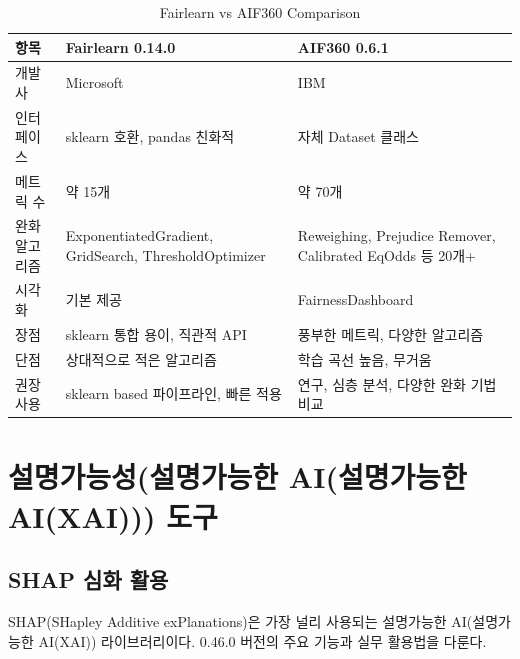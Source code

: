 \begin{table}[htbp]
\centering
\caption{Fairlearn vs AIF360 Comparison}
\label{tab:fairlearn_vs_aif360}
\begin{tabularx}{\textwidth}{p{3cm}XX}
\toprule
\textbf{항목} & \textbf{Fairlearn 0.14.0} & \textbf{AIF360 0.6.1} \\
\midrule
개발사 & Microsoft & IBM \\
\midrule
인터페이스 & sklearn 호환, pandas 친화적 & 자체 Dataset 클래스 \\
\midrule
메트릭 수 & 약 15개 & 약 70개 \\
\midrule
완화 알고리즘 & ExponentiatedGradient, GridSearch, ThresholdOptimizer & Reweighing, Prejudice Remover, Calibrated EqOdds 등 20개+ \\
\midrule
시각화 & 기본 제공 & FairnessDashboard \\
\midrule
장점 & sklearn 통합 용이, 직관적 API & 풍부한 메트릭, 다양한 알고리즘 \\
\midrule
단점 & 상대적으로 적은 알고리즘 & 학습 곡선 높음, 무거움 \\
\midrule
권장 사용 & sklearn based 파이프라인, 빠른 적용 & 연구, 심층 분석, 다양한 완화 기법 비교 \\
\bottomrule
\end{tabularx}
\end{table}


\section{설명가능성(설명가능한 AI(설명가능한 AI(XAI))) 도구}
\label{sec:6.3}

\subsection{SHAP 심화 활용}
\label{sec:6.3.1}

SHAP(SHapley Additive exPlanations)은 가장 널리 사용되는 설명가능한 AI(설명가능한 AI(XAI)) 라이브러리이다. 
0.46.0 버전의 주요 기능과 실무 활용법을 다룬다.

